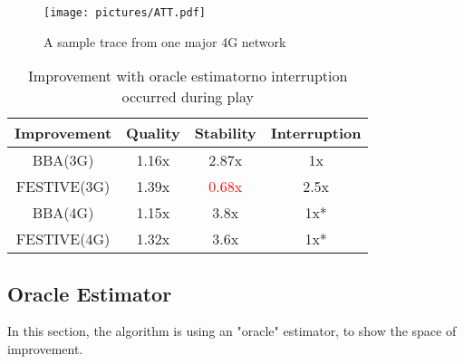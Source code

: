 


\begin{figure}[t]
 \texttt{[image: pictures/ATT.pdf]}
 \caption{A sample trace from one major 4G network}
\end{figure}

\begin{table}[t]

\begin{tabular} {|c |c |c |c |}
\hline
\textbf{ Improvement} &\textbf{Quality} &\textbf{Stability} & \textbf{Interruption}\\ \hline
BBA(3G)  & 1.16x& 2.87x& 1x \\ \hline
FESTIVE(3G)    & 1.39x & \textcolor{red}{0.68x}&2.5x\\ \hline
BBA(4G) & 1.15x&3.8x& 1x* \\ \hline
FESTIVE(4G) & 1.32x& 3.6x& 1x* \\ \hline
\end{tabular}
\centering
\caption{\large Improvement with oracle estimator\newline \small*no interruption occurred during play} \label{cap:table}
\end{table}



\subsection{Oracle Estimator}\label{sub:oracle}
In this section, the algorithm is using an "oracle" estimator, to show the space of improvement.


